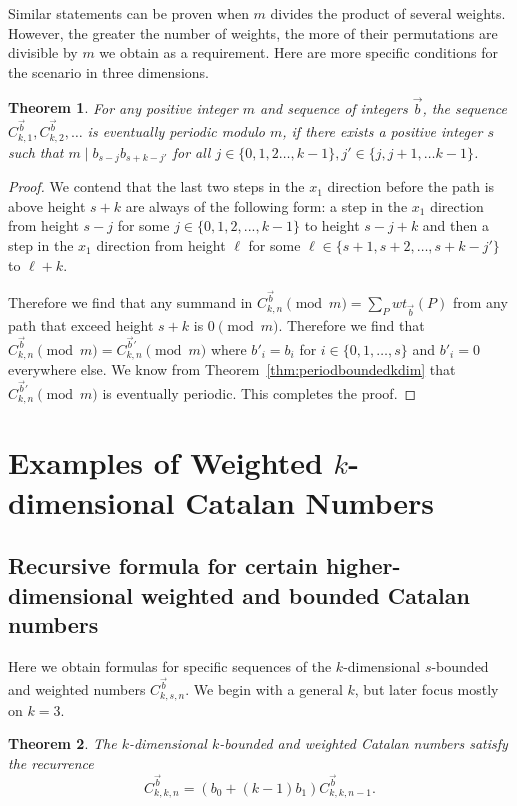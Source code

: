 \documentclass[12pt,notitlepage]{amsart}
\numberwithin{equation}{section}
\theoremstyle{thmstyleone}%
\newtheorem{theorem}{Theorem}[section]%
\theoremstyle{thmstyletwo}%
\theoremstyle{thmstylethree}%
\numberwithin{theorem}{section}
\numberwithin{equation}{section}
\begin{document}
Similar statements can be proven when $m$ divides the product of several weights. However, the greater the number of weights, the more of their permutations are divisible by $m$ we obtain as a requirement. Here are more specific conditions for the scenario in three dimensions.

\begin{theorem}
 For any positive integer $m$ and sequence of integers $\vec{b}$, the sequence $C^{\vec{b}}_{k,1}, C^{\vec{b}}_{k,2}, \dots$ is eventually periodic modulo $m$, if there exists a positive integer $s$ such that $m\mid b_{s-j}b_{s+k-j'}$ for all $j \in \{0,1,2 \dots, k-1\}, j' \in \{j,j+1, \dots k-1\}$.
\end{theorem}
\begin{proof}
  We contend that the last two steps in the $x_1$ direction before the path is above height $s+k$ are always of the following form: a step in the $x_1$ direction from height $s-j$ for some $j \in \{0, 1, 2, ..., k-1\}$ to height $s-j+k$ and then a step in the $x_1$ direction from height $\ell$ for some $\ell \in \{s+1, s+2, \dots, s+k-j'\}$ to $\ell+k$.

  Therefore we find that any summand in $C^{\vec{b}}_{k, n}\pmod{m} = \sum_{P}wt_{\vec{b}}(P)$ from any path that exceed height $s+k$ is $0 \pmod{m}$. Therefore we find that $C^{\vec{b}}_{k, n}\pmod{m} = C^{\vec{b}'}_{k, n}\pmod{m}$ where $b'_i = b_i$ for $i \in \{0,1, \dots, s\}$ and $b'_i = 0$ everywhere else. We know from Theorem~\ref{thm:periodboundedkdim} that $C^{\vec{b}'}_{k, n}\pmod{m}$ is eventually periodic. This completes the proof.
\end{proof}

\section{Examples of Weighted $k$-dimensional Catalan Numbers}
\subsection{Recursive formula for certain higher-dimensional weighted and bounded Catalan numbers}
\label{sec:multidimensional}

Here we obtain formulas for specific sequences of the $k$-dimensional $s$-bounded and weighted numbers $C^{\vec{b}}_{k,s,n}$. We begin with a general $k$, but later focus mostly on $k=3$. 
\begin{theorem}
\label{theorem:kboundedkdimensional}
    The $k$-dimensional $k$-bounded and weighted Catalan numbers satisfy the recurrence
    $$C^{\vec{b}}_{k,k,n}= (b_0 + (k-1)b_1)C^{\vec{b}}_{k,k,n-1}.$$ 
\end{theorem}
\end{document}
